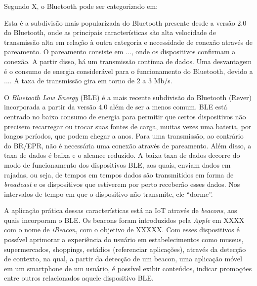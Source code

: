 \documentclass[
	article,			%
	11pt,				%
	oneside,			%
	a4paper,			%
	section=TITLE,		%
	subsection=TITLE,	%
	english,			%
	brazil,				%
	sumario=tradicional
	]{abntex2}
\begin{document}
Segundo X, o Bluetooth pode ser categorizado em:


Esta é a subdivisão mais popularizada do Bluetooth presente desde a versão $2.0$ do Bluetooth, onde 
as 
principais características são alta 
velocidade de transmissão alta em relação à outra categoria e necessidade de conexão através de 
pareamento. O pareamento consiste em ..., onde os dispositivos confirmam a conexão. A partir disso, 
há um transmissão contínua de dados. Uma desvantagem é o consumo de energia considerável para o 
funcionamento do Bluetooth, devido a .... 
A taxa de transmissão gira em torno de 2 a 3 Mb/s.
 

O \textit{Bluetooth Low Energy} (BLE) é a mais recente subdivisão do Bluetooth (Rever) incorporada 
a partir da versão 4.0 além de ser a menos comum.
BLE está centrado no baixo consumo de energia para permitir que certos 
dispositivos não precisem recarregar ou trocar suas fontes de carga, muitas vezes uma bateria, por 
longos períodos, que podem chegar a anos. 
Para uma transmissão, ao contrário do BR/EPR, não é necessária uma conexão através de pareamento.
Além disso, a taxa de dados é baixa e o alcance reduzido. A baixa taxa de dados decorre do modo de 
funcionamento dos dispositivos BLE, aos quais, enviam dados em rajadas, ou seja, de tempos em 
tempos dados são transmitidos em forma de \textit{broadcast} e os dispositivos que estiverem por 
perto receberão esses dados. Nos intervalos de tempo em que o dispositivo não transmite, ele 
``dorme''.

A aplicação prática dessas características está na IoT através de \textit{beacons}, aos quais 
incorporam o BLE. Os beacons foram introduzidos pela \textit{Apple} em XXXX com o nome de 
\textit{iBeacon}, com o objetivo de XXXXX. Com esses dispositivos é possível aprimorar a 
experiência do usuário em estabelecimentos como museus, supermercados, shoppings, estádios 
(referenciar aplicações), através da detecção de contexto, na qual, a partir da detecção de um 
beacon, uma aplicação móvel em um smartphone de um usuário, é possível exibir conteúdos, indicar 
promoções entre outros relacionados aquele dispositivo BLE.




\end{document}
